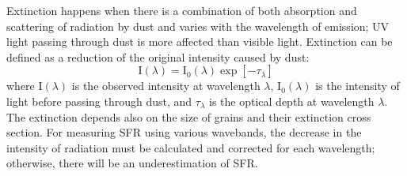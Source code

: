 Extinction happens when there is a combination of both absorption and scattering of radiation by dust and varies with the wavelength of emission; UV light passing through dust is more affected than visible light.
Extinction can be defined as a reduction of the original intensity caused by dust:
\begin{equation}
\label{equ: extinction}
{\mathrm I}(\lambda) = {\mathrm I}_0(\lambda)\exp[-\tau_{\lambda}]
\end{equation}
where I$(\lambda)$ is the observed intensity at wavelength $\lambda$, I$_0(\lambda)$ is the intensity of light before passing through dust, and $\tau_{\lambda}$ is the optical depth at wavelength $\lambda$.
The extinction depends also on the size of grains and their extinction cross section.
For measuring SFR using various wavebands, 
the decrease in the intensity of radiation must be calculated and corrected for each wavelength; otherwise, there will be an underestimation of SFR. 




